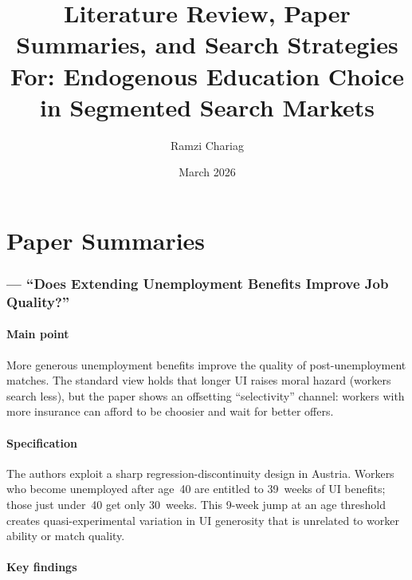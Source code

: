 \documentclass[12pt]{article}
\title{\textbf{Literature Review, Paper Summaries, and Search Strategies} \\ For: Endogenous Education Choice in Segmented Search Markets}
\author{Ramzi Chariag}
\date{March 2026}
\begin{document}
\maketitle
\tableofcontents
\newpage

\part{Paper Summaries}

\section{\citet{nekoei2017} --- ``Does Extending Unemployment Benefits Improve Job Quality?''}

\subsection*{Main point}

More generous unemployment benefits improve the quality of post-unemployment matches. The standard view holds that longer UI raises moral hazard (workers search less), but the paper shows an offsetting ``selectivity'' channel: workers with more insurance can afford to be choosier and wait for better offers.

\subsection*{Specification}

The authors exploit a sharp regression-discontinuity design in Austria. Workers who become unemployed after age~40 are entitled to 39~weeks of UI benefits; those just under~40 get only 30~weeks. This 9-week jump at an age threshold creates quasi-experimental variation in UI generosity that is unrelated to worker ability or match quality.

\subsection*{Key findings}
\end{document}
